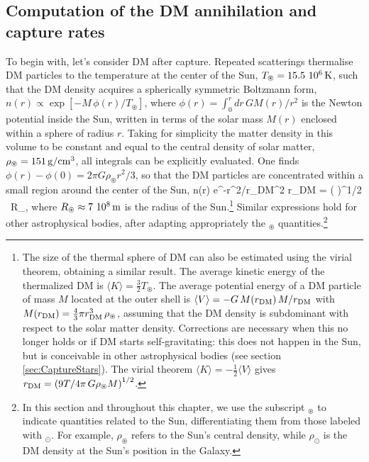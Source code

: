 \subsection{Computation of the DM annihilation and capture rates}\label{sec:captureDMsun}
To begin with, let's consider 
DM after capture. 
Repeated scatterings thermalise DM particles to the temperature at the center of the Sun, $T_\circledast=15.5~10^6\,{\rm K}$, \label{Tsuncore} 
such that the DM density acquires a spherically symmetric Boltzmann form, 
$n(r) \propto \exp[-M\, \phi(r)/T_\circledast] $, 
where $\phi(r) = \int_0^r dr \, G M(r)/r^2$ is the Newton potential inside the Sun, written in terms of the solar mass $M(r)$ enclosed within a sphere of radius $r$. 
Taking for simplicity the matter density in this volume to be constant 
and equal to the central density of solar matter, 
$\rho_\circledast=151\,{\rm g}/{\rm cm}^3$, all integrals can be explicitly evaluated. 
One finds  $\phi(r) -\phi(0)= 2\pi G\rho_\circledast r^2/3$, so that the 
DM particles are concentrated within a small region around the center of the Sun,
\beq\label{eq:n(r)}
n(r) \propto e^{-r^2/r_{\rm DM}^2}  \qquad  
r_{\rm DM} = \left( \right)^{1/2} \, R_\circledast {},
\eeq
where $R_\circledast \approx 7~10^8\,{\rm m}$ is the radius of the 
Sun.\footnote{The size of the thermal sphere of DM can also be estimated using the virial theorem, obtaining a similar result.
The average kinetic energy of the thermalized DM is $\langle K \rangle = \frac32 T_\circledast$. The average potential energy of a DM particle of mass $M$ located at the outer shell is $\langle V \rangle = - G \, M(r_{\rm DM}) \, M / r_{\rm DM}$ with $M(r_{\rm DM})= \frac43 \pi r_{\rm DM}^3 \, \rho_\circledast$, assuming that the DM density is subdominant with respect to the solar matter density. Corrections are necessary when this no longer holds or if DM starts self-gravitating: this does not happen in the Sun, but is conceivable in other astrophysical bodies (see section \ref{sec:CaptureStars}). 
The virial theorem $\langle K \rangle = - \frac12 \langle V \rangle$ gives $r_{\rm DM} = \left(9T/4\pi \, G \rho_\circledast M\right)^{1/2}$.}
Similar expressions hold for other astrophysical bodies, after adapting appropriately the $_\circledast$ quantities.\footnote{In this section and throughout this chapter, we use the subscript $_\circledast$ to indicate quantities related to the Sun, differentiating them from those labeled with $_\odot$. For example, $\rho_\circledast$ refers to the Sun's central density, while $\rho_\odot$ is the DM density at the Sun's position in the Galaxy.}


